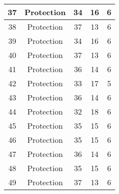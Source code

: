 \documentclass[results.tex]{subfiles}
\begin{document}
\begin{center}
\begin{tabular}{| c || c | c | c | c |}
            \hline
            37                      & Protection                   & 34                     & 16                      & 6                    \\
            \hline
            38                      & Protection                   & 37                     & 13                      & 6                    \\
            \hline
            39                      & Protection                   & 34                     & 16                      & 6                    \\
            \hline
            40                      & Protection                   & 37                     & 13                      & 6                    \\
            \hline
            41                      & Protection                   & 36                     & 14                      & 6                    \\
            \hline
            42                      & Protection                   & 33                     & 17                      & 5                    \\
            \hline
            43                      & Protection                   & 36                     & 14                      & 6                    \\
            \hline
            44                      & Protection                   & 32                     & 18                      & 6                    \\
            \hline
            45                      & Protection                   & 35                     & 15                      & 6                    \\
            \hline
            46                      & Protection                   & 35                     & 15                      & 6                    \\
            \hline
            47                      & Protection                   & 36                     & 14                      & 6                    \\
            \hline
            48                      & Protection                   & 35                     & 15                      & 6                    \\
            \hline
            49                      & Protection                   & 37                     & 13                      & 6                    \\
            \hline
        \end{tabular}
    \end{center}
\end{document}
